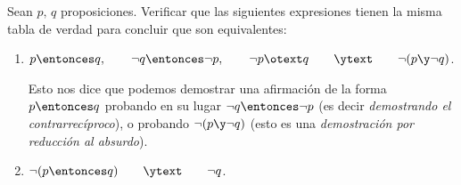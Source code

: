 \begin{enunciado}{\ejercicio}
  Sean $p,\, q$ proposiciones. Verificar que las siguientes expresiones tienen la misma tabla de verdad para
  concluir que son equivalentes:

  \begin{enumerate}[label=\roman*)]
    \item\label{10-1-i} $p \entonces q,
            \qquad
            \neg q \entonces \neg p, \qquad \neg p \otext q \qquad \ytext \qquad  \neg (p \y \neg q)$.

          Esto nos dice que podemos demostrar una afirmación de la forma $p \entonces q$ probando en su lugar
          $\neg q \entonces \neg p$ (es decir \textit{demostrando el contrarrecíproco}), o probando $\neg (p \y \neg q)$ (esto
          es una \textit{demostración por reducción al absurdo}).

    \item $\neg(p \entonces q)\qquad \ytext \qquad \neg q$.
  \end{enumerate}
\end{enunciado}


